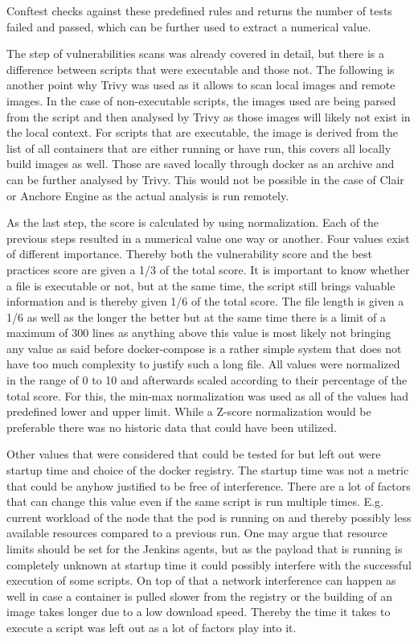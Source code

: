 Conftest checks against these predefined rules and returns the number of tests failed and passed, which can be further used to extract a numerical value.

The step of vulnerabilities scans was already covered in detail, but there is a difference between scripts that were executable and those not. The following is another point why Trivy was used as it allows to scan local images and remote images. In the case of non-executable scripts, the images used are being parsed from the script and then analysed by Trivy as those images will likely not exist in the local context. For scripts that are executable, the image is derived from the list of all containers that are either running or have run, this covers all locally build images as well. Those are saved locally through docker as an archive and can be further analysed by Trivy. This would not be possible in the case of Clair or Anchore Engine as the actual analysis is run remotely.

As the last step, the score is calculated by using normalization. Each of the previous steps resulted in a numerical value one way or another. Four values exist of different importance. Thereby both the vulnerability score and the best practices score are given a 1/3 of the total score. It is important to know whether a file is executable or not, but at the same time, the script still brings valuable information and is thereby given 1/6 of the total score. The file length is given a 1/6 as well as the longer the better but at the same time there is a limit of a maximum of 300 lines as anything above this value is most likely not bringing any value as said before docker-compose is a rather simple system that does not have too much complexity to justify such a long file.
All values were normalized in the range of 0 to 10 and afterwards scaled according to their percentage of the total score. For this, the min-max normalization was used as all of the values had predefined lower and upper limit. While a Z-score normalization would be preferable there was no historic data that could have been utilized.

Other values that were considered that could be tested for but left out were startup time and choice of the docker registry.
The startup time was not a metric that could be anyhow justified to be free of interference. There are a lot of factors that can change this value even if the same script is run multiple times. E.g. current workload of the node that the pod is running on and thereby possibly less available resources compared to a previous run. One may argue that resource limits should be set for the Jenkins agents, but as the payload that is running is completely unknown at startup time it could possibly interfere with the successful execution of some scripts. On top of that a network interference can happen as well in case a container is pulled slower from the registry or the building of an image takes longer due to a low download speed. Thereby the time it takes to execute a script was left out as a lot of factors play into it.

